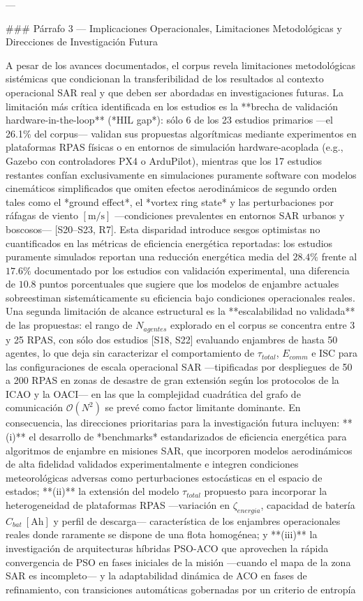 ---

### Párrafo 3 — Implicaciones Operacionales, Limitaciones Metodológicas y Direcciones de Investigación Futura

A pesar de los avances documentados, el corpus revela limitaciones metodológicas sistémicas que condicionan la transferibilidad de los resultados al contexto operacional SAR real y que deben ser abordadas en investigaciones futuras. La limitación más crítica identificada en los estudios es la **brecha de validación hardware-in-the-loop** (*HIL gap*): sólo 6 de los 23 estudios primarios —el 26.1\% del corpus— validan sus propuestas algorítmicas mediante experimentos en plataformas RPAS físicas o en entornos de simulación hardware-acoplada (e.g., Gazebo con controladores PX4 o ArduPilot), mientras que los 17 estudios restantes confían exclusivamente en simulaciones puramente software con modelos cinemáticos simplificados que omiten efectos aerodinámicos de segundo orden tales como el *ground effect*, el *vortex ring state* y las perturbaciones por ráfagas de viento $[\text{m/s}]$ —condiciones prevalentes en entornos SAR urbanos y boscosos— [S20–S23, R7]. Esta disparidad introduce sesgos optimistas no cuantificados en las métricas de eficiencia energética reportadas: los estudios puramente simulados reportan una reducción energética media del $28.4\%$ frente al $17.6\%$ documentado por los estudios con validación experimental, una diferencia de $10.8$ puntos porcentuales que sugiere que los modelos de enjambre actuales sobreestiman sistemáticamente su eficiencia bajo condiciones operacionales reales. Una segunda limitación de alcance estructural es la **escalabilidad no validada** de las propuestas: el rango de $N_{agentes}$ explorado en el corpus se concentra entre 3 y 25 RPAS, con sólo dos estudios [S18, S22] evaluando enjambres de hasta 50 agentes, lo que deja sin caracterizar el comportamiento de $\tau_{total}$, $E_{comm}$ e ISC para las configuraciones de escala operacional SAR —tipificadas por despliegues de 50 a 200 RPAS en zonas de desastre de gran extensión según los protocolos de la ICAO y la OACI— en las que la complejidad cuadrática del grafo de comunicación $\mathcal{O}(N^2)$ se prevé como factor limitante dominante. En consecuencia, las direcciones prioritarias para la investigación futura incluyen: **(i)** el desarrollo de *benchmarks* estandarizados de eficiencia energética para algoritmos de enjambre en misiones SAR, que incorporen modelos aerodinámicos de alta fidelidad validados experimentalmente e integren condiciones meteorológicas adversas como perturbaciones estocásticas en el espacio de estados; **(ii)** la extensión del modelo $\tau_{total}$ propuesto para incorporar la heterogeneidad de plataformas RPAS —variación en $\zeta_{energia}$, capacidad de batería $C_{bat}\ [\text{Ah}]$ y perfil de descarga— característica de los enjambres operacionales reales donde raramente se dispone de una flota homogénea; y **(iii)** la investigación de arquitecturas híbridas PSO-ACO que aprovechen la rápida convergencia de PSO en fases iniciales de la misión —cuando el mapa de la zona SAR es incompleto— y la adaptabilidad dinámica de ACO en fases de refinamiento, con transiciones automáticas gobernadas por un criterio de entropía 
